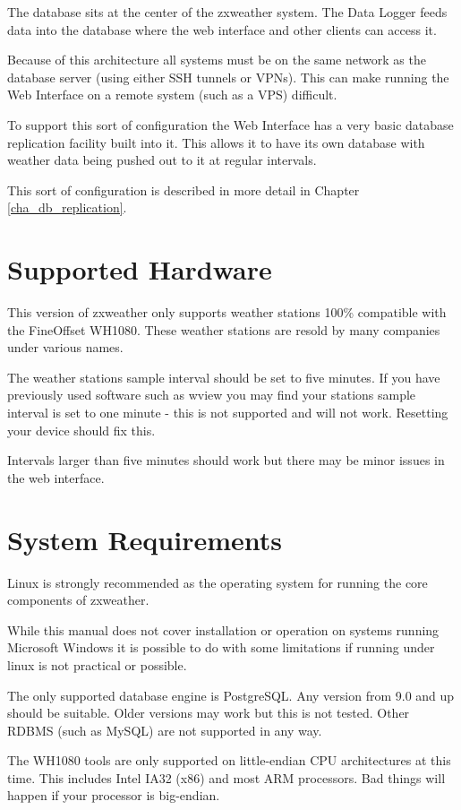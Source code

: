 \documentclass[a4paper,10pt,draft]{book}
\begin{document}
The database sits at the center of the zxweather system. The Data Logger feeds data into the database where the web interface and other clients can access it.

Because of this architecture all systems must be on the same network as the database server (using either SSH tunnels or VPNs). This can make running the Web Interface on a remote system (such as a VPS) difficult.

To support this sort of configuration the Web Interface has a very basic database replication facility built into it. This allows it to have its own database with weather data being pushed out to it at regular intervals.

This sort of configuration is described in more detail in Chapter \ref{cha_db_replication}.

\section{Supported Hardware}
This version of zxweather only supports weather stations 100\% compatible with the FineOffset WH1080. These weather stations are resold by many companies under various names.

The weather stations sample interval should be set to five minutes. If you have previously used software such as wview you may find your stations sample interval is set to one minute - this is not supported and will not work. Resetting your device should fix this.

Intervals larger than five minutes should work but there may be minor issues in the web interface.

\section{System Requirements}
Linux is strongly recommended as the operating system for running the core components of zxweather. 

While this manual does not cover installation or operation on systems running Microsoft Windows it is possible to do with some limitations if running under linux is not practical or possible.

The only supported database engine is PostgreSQL. Any version from 9.0 and up should be suitable. Older versions may work but this is not tested. Other RDBMS (such as MySQL) are not supported in any way.

The WH1080 tools are only supported on little-endian CPU architectures at this time. This includes Intel IA32 (x86) and most ARM processors. Bad things will happen if your processor is big-endian.
\end{document}
